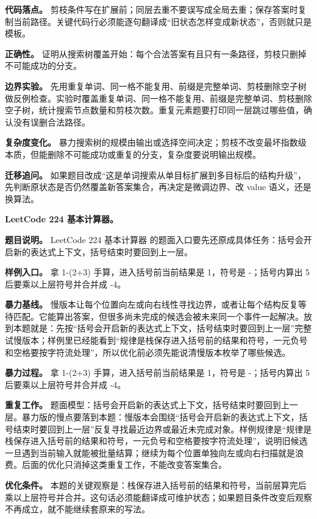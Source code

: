\textbf{代码落点。} 剪枝条件写在扩展前；同层去重不要误写成全局去重；保存答案时复制当前路径。关键代码行必须能逐句翻译成“旧状态怎样变成新状态”，否则就只是模板。

\textbf{正确性。} 证明从搜索树覆盖开始：每个合法答案有且只有一条路径，剪枝只删掉不可能成功的分支。

\textbf{边界实验。} 先用重复单词、同一格不能复用、前缀是完整单词、剪枝删除空子树做反例检查。实验时覆盖重复单词、同一格不能复用、前缀是完整单词、剪枝删除空子树，统计搜索节点数量和剪枝次数。重复元素题要打印同一层跳过哪些值，确认没有误删合法路径。

\textbf{复杂度变化。} 暴力搜索树的规模由输出或选择空间决定；剪枝不改变最坏指数级本质，但能删除不可能成功或重复的分支，复杂度要说明输出规模。

\textbf{迁移追问。} 如果题目改成“这是单词搜索从单目标扩展到多目标后的结构升级”，先判断原状态是否仍然覆盖新答案集合，再决定是微调边界、改 value 语义，还是换算法。

\noindent\textbf{LeetCode 224 基本计算器。}

\textbf{题目说明。} LeetCode 224 基本计算器 的题面入口要先还原成具体任务：括号会开启新的表达式上下文，括号结束时要回到上一层。

\textbf{样例入口。} 拿 1-(2+3) 手算，进入括号前当前结果是 1，符号是 -；括号内算出 5 后要乘以上层符号并合并成 -4。

\textbf{暴力基线。} 慢版本让每个位置向左或向右线性寻找边界，或者让每个结构反复等待匹配。它能算出答案，但很多尚未完成的候选会被未来同一个事件一起解决。放到本题就是：先按“括号会开启新的表达式上下文，括号结束时要回到上一层”完整试慢版本；样例里已经能看到“规律是栈保存进入括号前的结果和符号，一元负号和空格要按字符流处理”，所以优化前必须先能说清慢版本枚举了哪些候选。

\textbf{暴力过程。} 拿 1-(2+3) 手算，进入括号前当前结果是 1，符号是 -；括号内算出 5 后要乘以上层符号并合并成 -4。

\textbf{重复工作。} 题面模型：括号会开启新的表达式上下文，括号结束时要回到上一层。暴力版的慢点要落到本题：慢版本会围绕“括号会开启新的表达式上下文，括号结束时要回到上一层”反复寻找最近边界或最近未完成对象。样例规律是“规律是栈保存进入括号前的结果和符号，一元负号和空格要按字符流处理”，说明旧候选一旦遇到当前输入就能被批量结算；继续为每个位置单独向左或向右扫描就是浪费。后面的优化只消掉这类重复工作，不能改变答案集合。

\textbf{优化条件。} 本题的关键观察是：栈保存进入括号前的结果和符号，当前层算完后乘以上层符号并合并。这句话必须能翻译成可维护状态；如果题目条件改变后观察不再成立，就不能继续套原来的写法。

